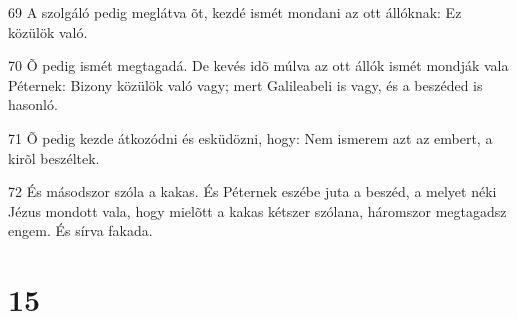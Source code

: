 \par 69 A szolgáló pedig meglátva õt, kezdé ismét mondani az ott állóknak: Ez közülök való.
\par 70 Õ pedig ismét megtagadá. De kevés idõ múlva az ott állók ismét mondják vala Péternek: Bizony közülök való vagy; mert Galileabeli is vagy, és a beszéded is hasonló.
\par 71 Õ pedig kezde átkozódni és esküdözni, hogy: Nem ismerem azt az embert, a kirõl beszéltek.
\par 72 És másodszor szóla a kakas. És Péternek eszébe juta a beszéd, a melyet néki Jézus mondott vala, hogy mielõtt a kakas kétszer szólana, háromszor megtagadsz engem. És sírva fakada.

\chapter{15}

